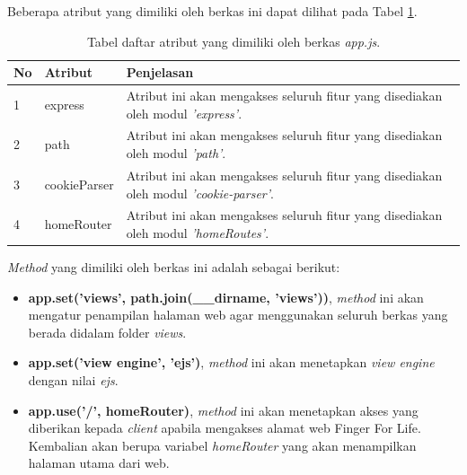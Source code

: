 \begin{enumerate}
	Beberapa atribut yang dimiliki oleh berkas ini dapat dilihat pada Tabel \ref{table:atribut_app}.
	\begin{table}[H]
		\centering
		\caption{Tabel daftar atribut yang dimiliki oleh berkas \textit{app.js}.}
		\begin{tabular}{|p{0.35cm}|p{3cm}|p{7cm}|}
			\hline
			No & Atribut & Penjelasan \\ \hline
			1 & express & Atribut ini akan mengakses seluruh fitur yang disediakan oleh modul \textit{'express'}. \\ \hline
			2 & path & Atribut ini akan mengakses seluruh fitur yang disediakan oleh modul \textit{'path'}. \\ \hline
			3 & cookieParser & Atribut ini akan mengakses seluruh fitur yang disediakan oleh modul \textit{'cookie-parser'}. \\ \hline
			4 & homeRouter & Atribut ini akan mengakses seluruh fitur yang disediakan oleh modul \textit{'homeRoutes'}. \\ \hline
		\end{tabular}
		\label{table:atribut_app}
	\end{table}
%		
%		
%		
	
	\textit{Method} yang dimiliki oleh berkas ini adalah sebagai berikut:
	\begin{itemize}
		\item \textbf{app.set('views', path.join(\_\_dirname, 'views'))}, \textit{method} ini akan mengatur penampilan halaman web agar menggunakan seluruh berkas yang berada didalam folder \textit{views}.
		
		\item \textbf{app.set('view engine', 'ejs')}, \textit{method} ini akan menetapkan \textit{view engine} dengan nilai \textit{ejs}.
		
		\item \textbf{app.use('/', homeRouter)}, \textit{method} ini akan menetapkan akses yang diberikan kepada \textit{client} apabila mengakses alamat web Finger For Life. Kembalian akan berupa variabel \textit{homeRouter} yang akan menampilkan halaman utama dari web.
	\end{itemize}
	
	
	
\end{enumerate}